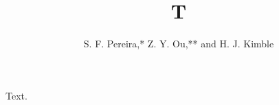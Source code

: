 
\title{T}
\author{S. F. Pereira,* Z. Y. Ou,** and H. J. Kimble}
\address{Norman Bridge Laboratory, Pasadena}
\maketitle
Text.

